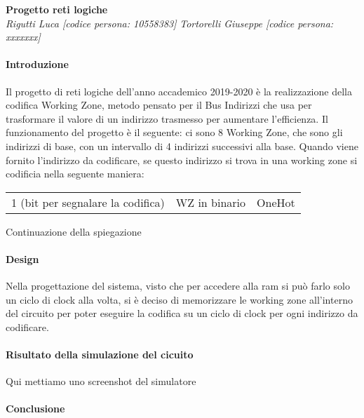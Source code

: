\documentclass{article}
\begin{document}
\begin{titlepage}
   \begin{center}
      \Large\textbf{Progetto reti logiche}\\
      \large\textit{Rigutti Luca [codice persona: 10558383]}
      \linebreak
      \large\textit{Tortorelli Giuseppe [codice persona: xxxxxxx]}
   \end{center}
\end{titlepage}

\paragraph{Introduzione}
Il progetto di reti logiche dell'anno accademico 2019-2020 è la realizzazione della codifica Working Zone, metodo pensato per il Bus Indirizzi che usa per trasformare il valore di un indirizzo trasmesso per aumentare l'efficienza.
Il funzionamento del progetto è il seguente:
ci sono 8 Working Zone, che sono gli indirizzi di base, con un intervallo di 4 indirizzi successivi alla base. Quando viene fornito l'indirizzo da codificare, se questo indirizzo si trova in una working zone si codificia nella seguente maniera:
\begin{center}
\begin{tabular}{c c c}
1 (bit per segnalare la codifica) & WZ in binario & OneHot
\end{tabular}
\end{center}
Continuazione della spiegazione
\paragraph{Design}
Nella progettazione del sistema, visto che per accedere alla ram si può farlo solo un ciclo di clock alla volta, si è deciso di memorizzare le working zone all'interno del circuito per poter eseguire la codifica su un ciclo di clock per ogni indirizzo da codificare.
\paragraph{Risultato della simulazione del cicuito}
Qui mettiamo uno screenshot del simulatore
\paragraph{Conclusione}
\end{document}
